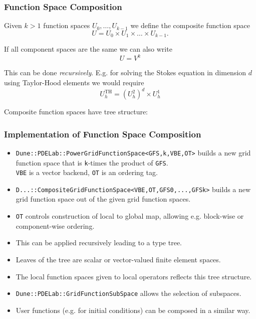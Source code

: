 \begin{frame}
\frametitle{Function Space Composition}
Given $k>1$ function spaces $U_0, \ldots, U_{k-1}$ we define the
composite function space 
\begin{equation*}
U = U_0 \times U_1 \times \ldots \times U_{k-1} .
\end{equation*}

If all component spaces are the same we can also write
\begin{equation*}
U = V^k
\end{equation*}

This can be done \textit{recursively}. E.g. for solving the Stokes equation
in dimension $d$ using Taylor-Hood elements we would require
\begin{equation*}
U_h^\text{TH} = \left( U_h^2\right)^d \times U_h^1
\end{equation*}

Composite function spaces have tree structure:
\begin{minipage}[c]{0.2\textwidth}
\end{minipage}
\end{frame}

\begin{frame}
\frametitle{Implementation of Function Space Composition}
\begin{itemize}    
\item \lstinline{Dune::PDELab::PowerGridFunctionSpace<GFS,k,VBE,OT>} builds a
new grid function space that is \lstinline{k}-times the product of \lstinline{GFS}.\\
\lstinline{VBE} is a vector backend, \lstinline{OT} is an ordering tag.
\item \lstinline{D...::CompositeGridFunctionSpace<VBE,OT,GFS0,...,GFSk>}
builds a new grid function space out of the given grid function
spaces. 
\item \lstinline{OT} controls construction of local to global map, allowing e.g. block-wise or component-wise ordering.
\item This can be applied recursively leading to a type tree.
\item Leaves of the tree are scalar or vector-valued finite element spaces.
\item The local function spaces given to local operators reflects this tree structure.
\item \lstinline{Dune::PDELab::GridFunctionSubSpace} allows the selection of subspaces.
\item User functions (e.g. for initial conditions) can be composed in a similar way.
\end{itemize}
\end{frame}

